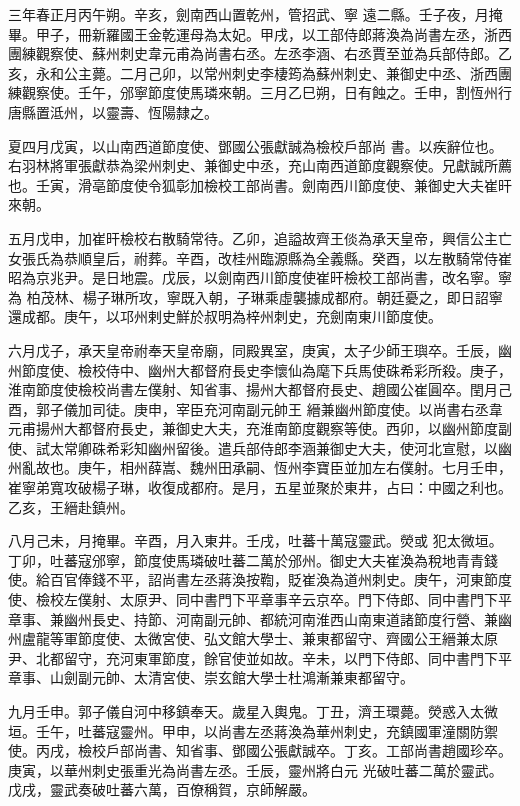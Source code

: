 \begin{pinyinscope}
 三年春正月丙午朔。辛亥，劍南西山置乾州，管招武、寧
 遠二縣。壬子夜，月掩畢。甲子，冊新羅國王金乾運母為太妃。甲戌，以工部侍郎蔣渙為尚書左丞，浙西團練觀察使、蘇州刺史韋元甫為尚書右丞。左丞李涵、右丞賈至並為兵部侍郎。乙亥，永和公主薨。二月己卯，以常州刺史李棲筠為蘇州刺史、兼御史中丞、浙西團練觀察使。壬午，邠寧節度使馬璘來朝。三月乙巳朔，日有蝕之。壬申，割恆州行唐縣置泜州，以靈壽、恆陽隸之。



 夏四月戊寅，以山南西道節度使、鄧國公張獻誠為檢校戶部尚
 書。以疾辭位也。右羽林將軍張獻恭為梁州刺史、兼御史中丞，充山南西道節度觀察使。兄獻誠所薦也。壬寅，滑亳節度使令狐彰加檢校工部尚書。劍南西川節度使、兼御史大夫崔旰來朝。



 五月戊申，加崔旰檢校右散騎常待。乙卯，追謚故齊王倓為承天皇帝，興信公主亡女張氏為恭順皇后，祔葬。辛酉，改桂州臨源縣為全義縣。癸酉，以左散騎常侍崔昭為京兆尹。是日地震。戊辰，以劍南西川節度使崔旰檢校工部尚書，改名寧。寧為
 柏茂林、楊子琳所攻，寧既入朝，子琳乘虛襲據成都府。朝廷憂之，即日詔寧還成都。庚午，以邛州剌史鮮於叔明為梓州刺史，充劍南東川節度使。



 六月戊子，承天皇帝祔奉天皇帝廟，同殿異室，庚寅，太子少師王璵卒。壬辰，幽州節度使、檢校侍中、幽州大都督府長史李懷仙為麾下兵馬使硃希彩所殺。庚子，淮南節度使檢校尚書左僕射、知省事、揚州大都督府長史、趙國公崔圓卒。閏月己酉，郭子儀加司徒。庚申，宰臣充河南副元帥王
 縉兼幽州節度使。以尚書右丞韋元甫揚州大都督府長史，兼御史大夫，充淮南節度觀察等使。西卯，以幽州節度副使、試太常卿硃希彩知幽州留後。遣兵部侍郎李涵兼御史大夫，使河北宣慰，以幽州亂故也。庚午，相州薛嵩、魏州田承嗣、恆州李寶臣並加左右僕射。七月壬申，崔寧弟寬攻破楊子琳，收復成都府。是月，五星並聚於東井，占曰：中國之利也。乙亥，王縉赴鎮州。



 八月己未，月掩畢。辛酉，月入東井。壬戌，吐蕃十萬寇靈武。熒或
 犯太微垣。丁卯，吐蕃寇邠寧，節度使馬璘破吐蕃二萬於邠州。御史大夫崔渙為稅地青青錢使。給百官俸錢不平，詔尚書左丞蔣渙按鞫，貶崔渙為道州刺史。庚午，河東節度使、檢校左僕射、太原尹、同中書門下平章事辛云京卒。門下侍郎、同中書門下平章事、兼幽州長史、持節、河南副元帥、都統河南淮西山南東道諸節度行營、兼幽州盧龍等軍節度使、太微宮使、弘文館大學士、兼東都留守、齊國公王縉兼太原
 尹、北都留守，充河東軍節度，餘官使並如故。辛未，以門下侍郎、同中書門下平章事、山劍副元帥、太清宮使、崇玄館大學士杜鴻漸兼東都留守。



 九月壬申。郭子儀自河中移鎮奉天。歲星入輿鬼。丁丑，濟王環薨。熒惑入太微垣。壬午，吐蕃寇靈州。甲申，以尚書左丞蔣渙為華州刺史，充鎮國軍潼關防禦使。丙戌，檢校戶部尚書、知省事、鄧國公張獻誠卒。丁亥。工部尚書趙國珍卒。庚寅，以華州刺史張重光為尚書左丞。壬辰，靈州將白元
 光破吐蕃二萬於靈武。戊戌，靈武奏破吐蕃六萬，百僚稱賀，京師解嚴。




\end{pinyinscope}
